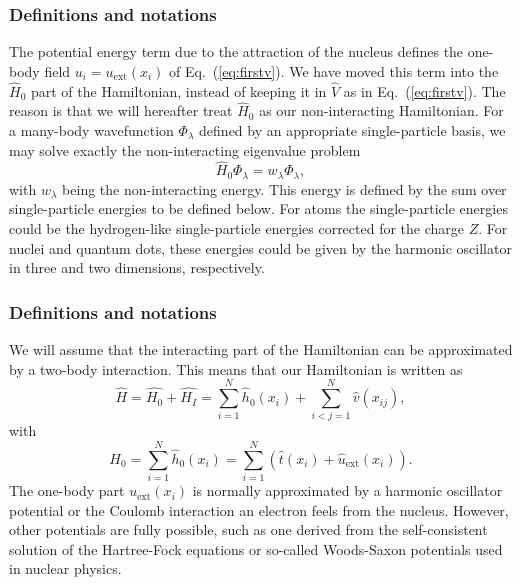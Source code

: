 \documentclass[compress]{beamer}
\begin{document}
\frame
{
  \frametitle{Definitions and notations}
\begin{small}
{\scriptsize
The potential energy term due to the attraction of the nucleus defines the one-body field $u_i=u_{\mathrm{ext}}(x_i)$ of Eq.~(\ref{eq:firstv}).
We have moved this term into the $\hat{H}_0$ part of the Hamiltonian, instead of keeping  it in $\hat{V}$ as in  Eq.~(\ref{eq:firstv}).
The reason is that we will hereafter treat $\hat{H}_0$ as our non-interacting  Hamiltonian. For a many-body wavefunction $\Phi_{\lambda}$ defined by an  
appropriate single-particle basis, we may solve exactly the non-interacting eigenvalue problem 
\[
\hat{H}_0\Phi_{\lambda}= w_{\lambda}\Phi_{\lambda},
\]
with $w_{\lambda}$ being the non-interacting energy. This energy is defined by the sum over single-particle energies to be defined below.
For atoms the single-particle energies could be the hydrogen-like single-particle energies corrected for the charge $Z$. For nuclei and quantum
dots, these energies could be given by the harmonic oscillator in three and two dimensions, respectively.
}
\end{small}
}

\frame
{
  \frametitle{Definitions and notations}
\begin{small}
{\scriptsize
We will assume that the interacting part of the Hamiltonian
can be approximated by a two-body interaction.
This means that our Hamiltonian is written as 
\begin{equation}
    \hat{H} = \hat{H_0} + \hat{H_I} 
    = \sum_{i=1}^N \hat{h}_0(x_i) + \sum_{i<j=1}^N \hat{v}(x_{ij}),
\label{Hnuclei}
\end{equation}
with 
\begin{equation}
  H_0=\sum_{i=1}^N \hat{h}_0(x_i) =  \sum_{i=1}^N\left(\hat{t}(x_i) + \hat{u}_{\mathrm{ext}}(x_i)\right).
\label{hinuclei}
\end{equation}
The one-body part $u_{\mathrm{ext}}(x_i)$ is normally approximated by a harmonic oscillator potential or the Coulomb interaction an electron feels from the nucleus. However, other potentials are fully possible, such as 
one derived from the self-consistent solution of the Hartree-Fock equations or so-called Woods-Saxon potentials used in nuclear physics.
}
\end{small}
}
\end{document}
